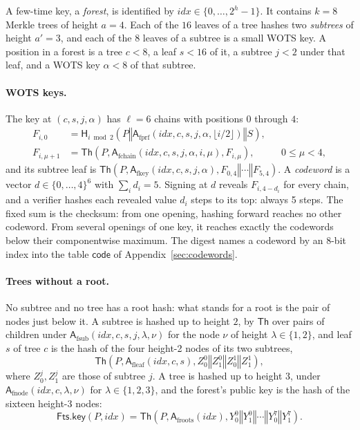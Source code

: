 \documentclass[11pt]{article}
\theoremstyle{plain}
\theoremstyle{definition}
\newcommand{\Th}{\mathsf{Th}}
\newcommand{\hash}{\mathsf{H}}
\newcommand{\concat}{\mathbin\Vert}
\newcommand{\addr}{\mathsf{A}}
\newcommand{\idx}{\mathit{idx}}
\newcommand{\lut}{\mathsf{code}}
\newcommand{\FtsKey}{\mathsf{Fts.key}}
\begin{document}
A few-time key, a \emph{forest}, is identified by $\idx\in\{0,\ldots,2^h-1\}$. It contains $k=8$ Merkle trees of height $a=4$. Each of the $16$ leaves of a tree hashes two \emph{subtrees} of height $a'=3$, and each of the $8$ leaves of a subtree is a small WOTS key. A position in a forest is a tree $c<8$, a leaf $s<16$ of it, a subtree $j<2$ under that leaf, and a WOTS key $\alpha<8$ of that subtree.

\paragraph{WOTS keys.}
The key at $(c,s,j,\alpha)$ has $\ell=6$ chains with positions $0$ through $4$:
\[
\begin{aligned}
  F_{i,0}&=\hash_{i\bmod2}\!\left(P\concat\addr_{\mathrm{fprf}}(\idx,c,s,j,\alpha,\lfloor i/2\rfloor)\concat S\right),\\
  F_{i,\mu+1}&=\Th\!\left(P,\addr_{\mathrm{fchain}}(\idx,c,s,j,\alpha,i,\mu),F_{i,\mu}\right),
    &&0\leq\mu<4,
\end{aligned}
\]
and its subtree leaf is $\Th\!\left(P,\addr_{\mathrm{fkey}}(\idx,c,s,j,\alpha),F_{0,4}\concat\cdots\concat F_{5,4}\right)$. A \emph{codeword} is a vector $d\in\{0,\ldots,4\}^6$ with $\sum_i d_i=5$. Signing at $d$ reveals $F_{i,4-d_i}$ for every chain, and a verifier hashes each revealed value $d_i$ steps to its top: always 5 steps. The fixed sum is the checksum: from one opening, hashing forward reaches no other codeword. From several openings of one key, it reaches exactly the codewords below their componentwise maximum. The digest names a codeword by an 8-bit index into the table $\lut$ of Appendix~\ref{sec:codewords}.

\paragraph{Trees without a root.}
No subtree and no tree has a root hash: what stands for a root is the pair of nodes just below it. A subtree is hashed up to height $2$, by $\Th$ over pairs of children under $\addr_{\mathrm{fsub}}(\idx,c,s,j,\lambda,\nu)$ for the node $\nu$ of height $\lambda\in\{1,2\}$, and leaf $s$ of tree $c$ is the hash of the four height-2 nodes of its two subtrees,
\[
  \Th\!\left(P,\addr_{\mathrm{fleaf}}(\idx,c,s),Z^{0}_{0}\concat Z^{0}_{1}\concat Z^{1}_{0}\concat Z^{1}_{1}\right),
\]
where $Z^{j}_{0},Z^{j}_{1}$ are those of subtree $j$. A tree is hashed up to height $3$, under $\addr_{\mathrm{fnode}}(\idx,c,\lambda,\nu)$ for $\lambda\in\{1,2,3\}$, and the forest's public key is the hash of the sixteen height-3 nodes:
\[
  \FtsKey(P,\idx)=\Th\!\left(P,\addr_{\mathrm{froots}}(\idx),Y^{0}_{0}\concat Y^{0}_{1}\concat\cdots\concat Y^{7}_{0}\concat Y^{7}_{1}\right).
\]
\end{document}
